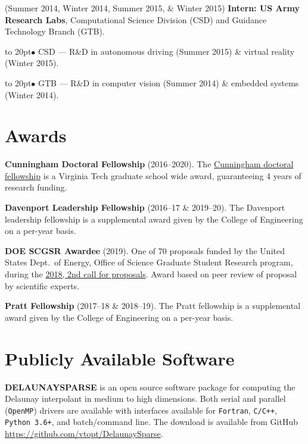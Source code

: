 \documentclass[12pt]{article}
\def\bullitem{\par\hangindent=15pt \hangafter=1
\noindent\hbox to 20pt{\hfil$\bullet$\hfil}\ignorespaces}
\begin{document}
\medskip

\hangindent=0.3in
(Summer 2014, Winter 2014, Summer 2015, \& Winter 2015)
\textbf{Intern: US Army Research Labs}, 
Computational Science Division (CSD) and Guidance Technology Branch (GTB).
\bullitem
CSD --- R\&D in autonomous driving (Summer 2015) \&
virtual reality (Winter 2015).
\bullitem
GTB --- R\&D in computer vision (Summer 2014) \& embedded systems (Winter 2014).

\medskip

\section*{Awards}

\textbf{Cunningham Doctoral Fellowship} (2016--2020).
The 
\href{https://graduateschool.vt.edu/funding/types-of-funding/funding-sponsored-by-the-graduate-school/cunningham-doctoral-assistantships.html}
{Cunningham doctoral fellowship} is a Virginia Tech graduate school wide
award, guaranteeing 4 years of research funding.

\textbf{Davenport Leadership Fellowship} (2016--17 \& 2019--20).
The Davenport leadership fellowship is a supplemental award given by
the College of Engineering on a per-year basis.

\textbf{DOE SCGSR Awardee} (2019).
One of 70 proposals funded by the United States Dept.\ of Energy,
Office of Science Graduate Student Research program, during the
\href{https://www.energy.gov/articles/doe-s-science-graduate-student-research-program-selects-70-students-pursue-research-doe}{2018, 2nd call for proposals}.
Award based on peer review of proposal by scientific experts.

\textbf{Pratt Fellowship} (2017--18 \& 2018--19).
The Pratt fellowship is a supplemental award given by
the College of Engineering on a per-year basis.

\section*{Publicly Available Software}

\textbf{DELAUNAYSPARSE} is an open source software package
for computing the Delaunay interpolant in medium to high dimensions.
Both serial and parallel (\texttt{OpenMP}) drivers are available
with interfaces available for
\texttt{Fortran},
\texttt{C/C++},
\texttt{Python 3.6+},
and batch/command line.
The download is available from GitHub
\url{https://github.com/vtopt/DelaunaySparse}.
\end{document}
